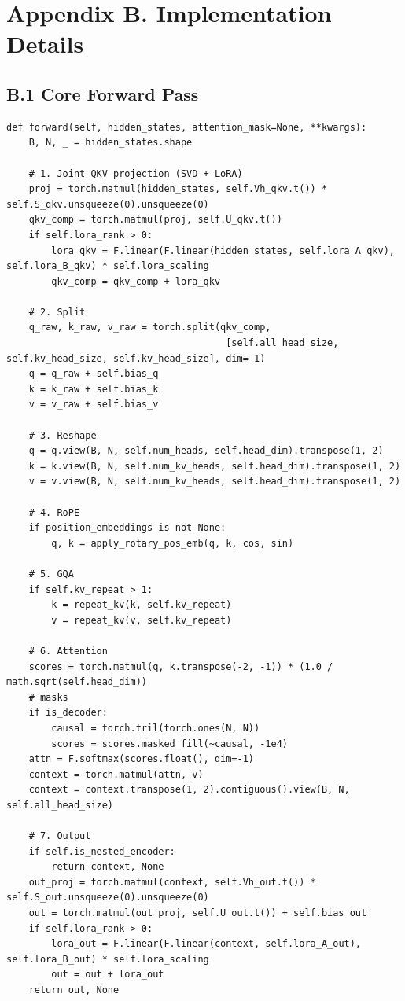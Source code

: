 \section{Appendix B. Implementation Details}

\subsection{B.1 Core Forward Pass}

\begin{lstlisting}
def forward(self, hidden_states, attention_mask=None, **kwargs):
    B, N, _ = hidden_states.shape
    
    # 1. Joint QKV projection (SVD + LoRA)
    proj = torch.matmul(hidden_states, self.Vh_qkv.t()) * self.S_qkv.unsqueeze(0).unsqueeze(0)
    qkv_comp = torch.matmul(proj, self.U_qkv.t())
    if self.lora_rank > 0:
        lora_qkv = F.linear(F.linear(hidden_states, self.lora_A_qkv), self.lora_B_qkv) * self.lora_scaling
        qkv_comp = qkv_comp + lora_qkv
    
    # 2. Split
    q_raw, k_raw, v_raw = torch.split(qkv_comp, 
                                       [self.all_head_size, self.kv_head_size, self.kv_head_size], dim=-1)
    q = q_raw + self.bias_q
    k = k_raw + self.bias_k
    v = v_raw + self.bias_v
    
    # 3. Reshape
    q = q.view(B, N, self.num_heads, self.head_dim).transpose(1, 2)
    k = k.view(B, N, self.num_kv_heads, self.head_dim).transpose(1, 2)
    v = v.view(B, N, self.num_kv_heads, self.head_dim).transpose(1, 2)
    
    # 4. RoPE
    if position_embeddings is not None:
        q, k = apply_rotary_pos_emb(q, k, cos, sin)
    
    # 5. GQA
    if self.kv_repeat > 1:
        k = repeat_kv(k, self.kv_repeat)
        v = repeat_kv(v, self.kv_repeat)
    
    # 6. Attention
    scores = torch.matmul(q, k.transpose(-2, -1)) * (1.0 / math.sqrt(self.head_dim))
    # masks
    if is_decoder:
        causal = torch.tril(torch.ones(N, N))
        scores = scores.masked_fill(~causal, -1e4)
    attn = F.softmax(scores.float(), dim=-1)
    context = torch.matmul(attn, v)
    context = context.transpose(1, 2).contiguous().view(B, N, self.all_head_size)
    
    # 7. Output
    if self.is_nested_encoder:
        return context, None
    out_proj = torch.matmul(context, self.Vh_out.t()) * self.S_out.unsqueeze(0).unsqueeze(0)
    out = torch.matmul(out_proj, self.U_out.t()) + self.bias_out
    if self.lora_rank > 0:
        lora_out = F.linear(F.linear(context, self.lora_A_out), self.lora_B_out) * self.lora_scaling
        out = out + lora_out
    return out, None
\end{lstlisting}

